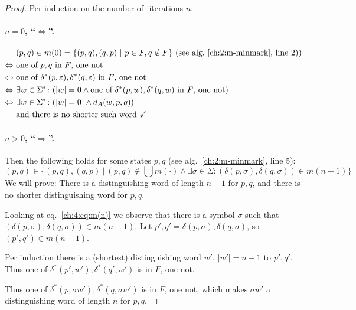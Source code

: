 \begin{proof}
	Per induction on the number of \CompDist-iterations $n$.
	
	\paragraph*{$n = 0$, ``$\Leftrightarrow$''.}
	\begin{align*}
		&(p,q) \in m(0) = \{ (p,q), (q,p)\ |\ p \in F, q \notin F \}\hfill\text{ (see alg.~\ref{ch:2:m-minmark}, line 2))}\\
		\Leftrightarrow\ &\text{one of $p,q$ in $F$, one not}\\
		\Leftrightarrow\ &\text{one of $\delta^*(p, \varepsilon),\delta^*(q, \varepsilon)$ in $F$, one not}\\
		\Leftrightarrow\ &\exists w\in\Sigma^*\colon (|w|=0\land\text{one of $\delta^*(p, w),\delta^*(q, w)$ in $F$, one not})\\
		\Leftrightarrow\ &\exists w\in\Sigma^*\colon (|w| = 0\ \land d_A(w, p, q))\\
		&\text{and there is no shorter such word }\checkmark
	\end{align*}

\paragraph*{$n > 0$, ``$\Rightarrow$''.} 
Then the following holds for some states $p,q$ (see alg.~\ref{ch:2:m-minmark}, line 5):
\begin{equation}\label{ch:4:eq:m(n)}
(p,q) \in \{ (p,q), (q,p)\ |\ (p,q) \notin \bigcup{m(\cdot)} \land \exists \sigma \in \Sigma \colon (\delta(p,\sigma), \delta(q,\sigma)) \in m(n-1) \}
\end{equation}
We will prove: There is a distinguishing word of length $n-1$ for $p,q$, and there is no shorter distinguishing word for $p,q$.

Looking at eq.~\ref{ch:4:eq:m(n)} we observe that there is a symbol $\sigma$ such that $(\delta(p,\sigma),\delta(q,\sigma)) \in m(n-1)$. Let $p',q'=\delta(p,\sigma),\delta(q,\sigma)$, so $(p',q')\in m(n-1)$.

Per induction there is a (shortest) distinguishing word $w'$, $|w'|=n-1$ to $p',q'$. Thus one of $\delta^*(p', w'),\delta^*(q', w')$ is in $F$, one not.

Thus one of $\delta^*(p, \sigma w'),\delta^*(q, \sigma w')$ is in $F$, one not, which makes $\sigma w'$ a distinguishing word of length $n$ for $p,q$.


\end{proof}

